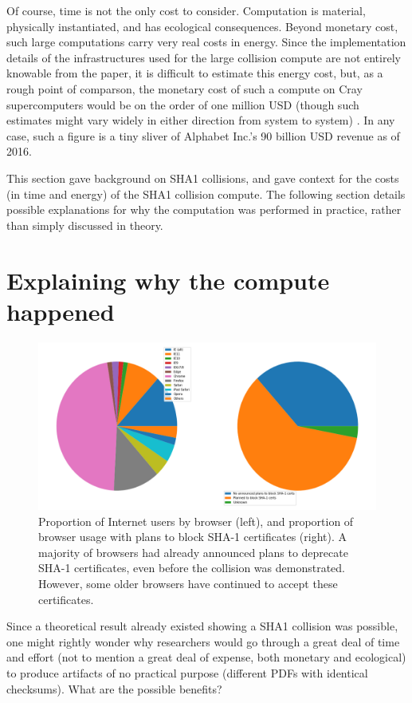 \documentclass[sigconf]{acmart}
\begin{document}
Of course, time is not the only cost to consider.
Computation is material, physically instantiated, and has ecological consequences.
Beyond monetary cost, such large computations carry very real costs in energy.
Since the implementation details of the infrastructures used for the large collision compute are not entirely knowable from the paper,
it is difficult to estimate this energy cost, but, as a rough point of comparson,
the monetary cost of such a compute on Cray supercomputers would be on the order of one million USD 
(though such estimates might vary widely in either direction from system to system)
\cite{Pautsch2016}.
In any case, such a figure is a tiny sliver of Alphabet Inc.'s 90 billion USD revenue as of 2016.

This section gave background on SHA1 collisions, 
and gave context for the costs (in time and energy) of the SHA1 collision compute.
The following section details possible explanations for why the computation was performed
in practice, rather than simply discussed in theory.

\section{Explaining why the compute happened}
\label{sec:org0b2b39c}

\begin{figure}
\centering
\includegraphics[width=.9\linewidth]{./figures/browser-share.png}
\caption{Proportion of Internet users by browser (left), and proportion of browser usage with plans to block SHA-1 certificates (right). A majority of browsers had already announced plans to deprecate SHA-1 certificates, even before the collision was demonstrated. However, some older browsers have continued to accept these certificates.}
\end{figure}

Since a theoretical result already existed showing a SHA1 collision was possible, 
one might rightly wonder why researchers would go through a great deal of time and effort
(not to mention a great deal of expense, both monetary and ecological)
to produce artifacts of no practical purpose (different PDFs with identical checksums).
What are the possible benefits?
\end{document}
